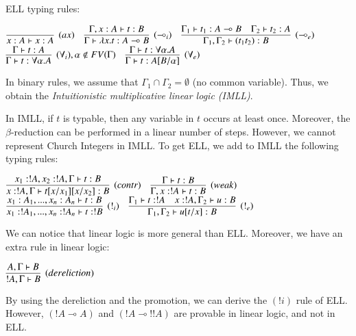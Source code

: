 \documentclass[a4paper,10pt]{article}
\newcommand{\limpl}{\multimap}  %
\begin{document}
\par ELL typing rules:\\
\vspace{-0.2cm}
\begin{center}
$	\infer[(ax)]{x:A \vdash x:A}{} \quad
	\infer[(\limpl_i)]{\Gamma \vdash \lambda x.t : A \limpl B}{\Gamma, x:A \vdash t:B} \quad
	\infer[(\limpl_e)]{\Gamma_1, \Gamma_2 \vdash (t_1 t_2) : B}{\Gamma_1 \vdash t_1 : A \limpl B & \Gamma_2 \vdash t_2 : A }$\\
\vspace{0.2cm}
$	\infer[(\forall_i), \alpha \notin FV(\Gamma)]{\Gamma \vdash t:\forall \alpha.A}{\Gamma \vdash t:A} \quad
	\infer[(\forall_e)]{\Gamma \vdash t:A[B/\alpha]}{\Gamma \vdash t:\forall \alpha.A}
$
\end{center}

\par In binary rules, we assume that $\Gamma_1 \cap \Gamma_2 = \emptyset$ (no common variable). Thus, we obtain the \emph{Intuitionistic multiplicative linear logic (IMLL)}.


\par In IMLL, if $t$ is typable, then any variable in $t$ occurs at least once. Moreover, the $\beta$-reduction can be performed in a linear number of steps. However, we cannot represent Church Integers in IMLL. To get ELL, we add to IMLL the following typing rules:

\begin{center}
$	\infer[(contr)]{x:!A, \Gamma \vdash t[x/x_1][x/x_2]:B}{x_1 : !A, x_2 : !A, \Gamma \vdash t : B } \quad
	\infer[(weak)]{\Gamma, x:!A \vdash t : B}{\Gamma \vdash t:B}$ \\
	\vspace{0.5cm}
$	\infer[(!_i)]{x_1 : !A_1, ..., x_n : !A_n \vdash t : !B}{x_1 : A_1, ..., x_n : A_n \vdash t : B} \quad
	\infer[(!_e)]{\Gamma_1, \Gamma_2 \vdash u[t/x] : B}{\Gamma_1 \vdash t:!A  &  x:!A,\Gamma_2 \vdash u:B}
$
\end{center}

\par We can notice that linear logic is more general than ELL. Moreover, we have an extra rule in linear logic:
\begin{center}
$\infer[(dereliction)]{!A, \Gamma \vdash B}{A, \Gamma \vdash B }$
\end{center}

\par By using the dereliction and the promotion, we can derive the $(!i)$ rule of ELL. However, $(!A \limpl A)$ and $(!A \limpl !!A)$ are provable in linear logic, and not in ELL.
\end{document}
